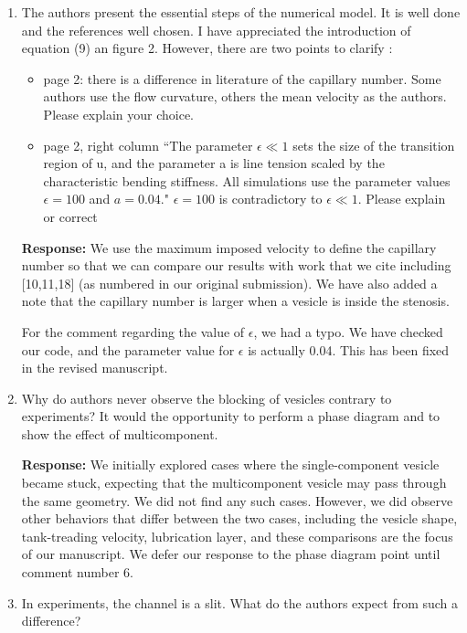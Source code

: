 \documentclass[11pt]{article}
\begin{document}
\begin{enumerate}
\item The authors present the essential steps of the numerical model. It
  is well done and the references well chosen. I have appreciated the
    introduction of equation (9) an figure 2. However, there are two
    points to clarify :
    \begin{itemize}
      \item page 2: there is a difference in literature of the
        capillary number. Some authors use the flow curvature, others
        the mean velocity as the authors. Please explain your choice.
      \item page 2, right column ``The parameter $\epsilon \ll 1$ sets
        the size of the transition region of u, and the parameter a is
        line tension scaled by the characteristic bending stiffness. All
        simulations use the parameter values $\epsilon = 100$ and $a =
        0.04.$" $\epsilon = 100$ is contradictory to $\epsilon \ll 1$.
        Please explain or correct
    \end{itemize}

\noindent
{\bf Response:} We use the maximum imposed velocity to define the
capillary number so that we can compare our results with work that we
cite including [10,11,18] (as numbered in our original submission). We
have also added a note that the capillary number is larger when a
vesicle is inside the stenosis.

For the comment regarding the value of $\epsilon$, we had a typo. We
have checked our code, and the parameter value for $\epsilon$ is
actually 0.04. This has been fixed in the revised manuscript.

\item Why do authors never observe the blocking of vesicles contrary to
  experiments? It would the opportunity to perform a phase diagram and
    to show the effect of multicomponent.

\noindent
{\bf Response:} We initially explored cases where the single-component
vesicle became stuck, expecting that the multicomponent vesicle may pass
through the same geometry. We did not find any such cases.
However, we did observe other behaviors that differ between the two
cases, including the vesicle shape, tank-treading velocity, lubrication
layer, and these comparisons are the focus of our manuscript. We defer
our response to the phase diagram point until comment number 6.

%

\item In experiments, the channel is a slit. What do the authors expect
  from such a difference?


\end{enumerate}
\end{document}
